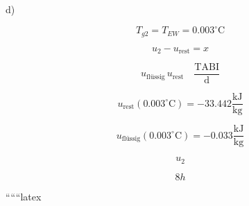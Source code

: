 d)

\[
T_{g2} = T_{EW} = 0.003^\circ \text{C}
\]

\[
u_2 - u_{\text{rest}} = x
\]

\[
u_{\text{flüssig}} \, u_{\text{rest}} \quad \frac{\text{TABI}}{\text{d}}
\]

\[
u_{\text{rest}} (0.003^\circ \text{C}) = -33.442 \frac{\text{kJ}}{\text{kg}}
\]

\[
u_{\text{flüssig}} (0.003^\circ \text{C}) = -0.033 \frac{\text{kJ}}{\text{kg}}
\]

\[
u_2
\]

\[
8h
\]

``````latex